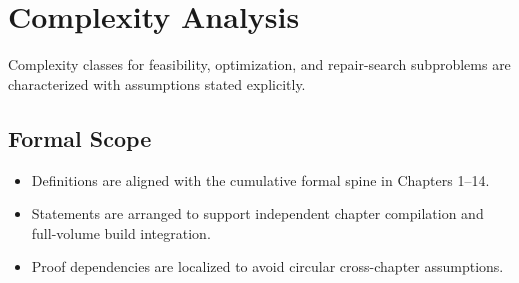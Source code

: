 \documentclass[../../clio.tex]{subfiles}
\begin{document}
\chapter{Complexity Analysis}
\label{apx:e-complexity}

Complexity classes for feasibility, optimization, and repair-search subproblems are characterized with assumptions stated explicitly.

\section{Formal Scope}
\begin{itemize}
  \item Definitions are aligned with the cumulative formal spine in Chapters 1--14.
  \item Statements are arranged to support independent chapter compilation and full-volume build integration.
  \item Proof dependencies are localized to avoid circular cross-chapter assumptions.
\end{itemize}
\end{document}
